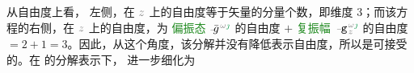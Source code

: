 从自由度上看， 左侧，在 $\mathcolor{gray}{z}$ 上的自由度等于矢量的分量个数，即维度 3；而该方程的右侧，在 $\mathcolor{gray}{z}$ 上的自由度，为 \textcolor{ForestGreen}{偏振态} $\Xint{{}^{}_{\mathcolor{gray}{-}}}{10}{\bar{g}}^{\;\!\mathcolor{gray}{\omega} \textcolor{ForestGreen}{\jmath}}$ 的自由度 $+$ \textcolor{ForestGreen}{复振幅} $\Xint{\begin{smallmatrix} ~ \\ {}^{}_{\mathcolor{gray}{-}} \\ ~ \end{smallmatrix}}{09}{\mathtt{g}}^{\;\!\mathcolor{gray}{\omega} \textcolor{ForestGreen}{\jmath}}_{\;\! \mathcolor{gray}{z}}$ 的自由度 $= 2 + 1 = 3$。因此，从这个角度，该分解并没有降低表示自由度，所以是可接受的。在  的分解表示下， 进一步细化为
